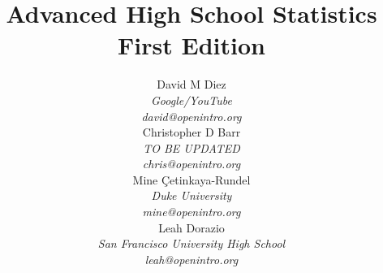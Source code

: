 
\title{\huge Advanced High School Statistics\vspace{1.5mm} \\ \Large First Edition}
\author{David M Diez \\
\small\emph{Google/YouTube} \\
\vspace{6mm}%
\small\emph{david@openintro.org} \\
Christopher D Barr \\
\small\emph{{\color{red}TO BE UPDATED}} \\
\vspace{6mm}%
\small\emph{chris@openintro.org} \\
Mine \c{C}etinkaya-Rundel \\
\small\emph{Duke University} \\
\vspace{6mm}%
\small\emph{mine@openintro.org} \\
Leah Dorazio \\
\small\emph{San Francisco University High School} \\
\small\emph{leah@openintro.org}}
